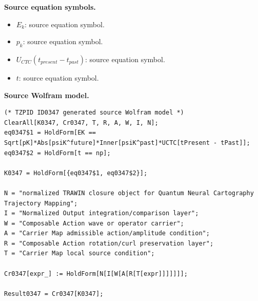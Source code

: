 \begin{minipage}[t]{0.49\linewidth}
\begingroup
\small
\raggedright
\textbf{Source equation symbols.}\par
\begin{itemize}[leftmargin=1.35em,itemsep=1pt,topsep=1pt,parsep=0pt]
    \item $E_k$: source equation symbol.
    \item $p_k$: source equation symbol.
    \item $U_{CTC}(t_{present}-t_{past})$: source equation symbol.
    \item $t$: source equation symbol.
\end{itemize}
\endgroup
\end{minipage}\hfill
\begin{minipage}[t]{0.47\linewidth}
\begingroup
\scriptsize
\raggedright
\textbf{Source Wolfram model.}\par
\begin{Verbatim}[fontsize=\tiny,breaklines=true,breakanywhere=true]
(* TZPID ID0347 generated source Wolfram model *)
ClearAll[K0347, Cr0347, T, R, A, W, I, N];
eq0347$1 = HoldForm[EK == Sqrt[pK]*Abs[psiK^future]*Inner[psiK^past]*UCTC[tPresent - tPast]];
eq0347$2 = HoldForm[t == np];

K0347 = HoldForm[{eq0347$1, eq0347$2}];

N = "normalized TRAWIN closure object for Quantum Neural Cartography Trajectory Mapping";
I = "Normalized Output integration/comparison layer";
W = "Composable Action wave or operator carrier";
A = "Carrier Map admissible action/amplitude condition";
R = "Composable Action rotation/curl preservation layer";
T = "Carrier Map local source condition";

Cr0347[expr_] := HoldForm[N[I[W[A[R[T[expr]]]]]]];

Result0347 = Cr0347[K0347];
\end{Verbatim}
\endgroup
\end{minipage}

